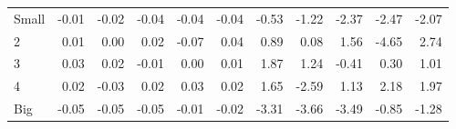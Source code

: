 \begin{table}[!ht]
\begin{tabular}{lrrrrrrrrrr}
    \\
      \cmidrule(r){2-6} \cmidrule(r){7-11}

    Small   & -0.01  & -0.02  & -0.04  & -0.04  & -0.04  & -0.53  & -1.22  & -2.37  & -2.47  & -2.07  \\
         2  & 0.01  & 0.00  & 0.02  & -0.07  & 0.04  & 0.89  & 0.08  & 1.56  & -4.65  & 2.74  \\
         3  & 0.03  & 0.02  & -0.01  & 0.00  & 0.01  & 1.87  & 1.24  & -0.41  & 0.30  & 1.01  \\
         4  & 0.02  & -0.03  & 0.02  & 0.03  & 0.02  & 1.65  & -2.59  & 1.13  & 2.18  & 1.97  \\
    Big     & -0.05  & -0.05  & -0.05  & -0.01  & -0.02  & -3.31  & -3.66  & -3.49  & -0.85  & -1.28  \\

  

  \bottomrule
\end{tabular}
\label{tbl:25_Size_Inv_C1997}
\end{table}